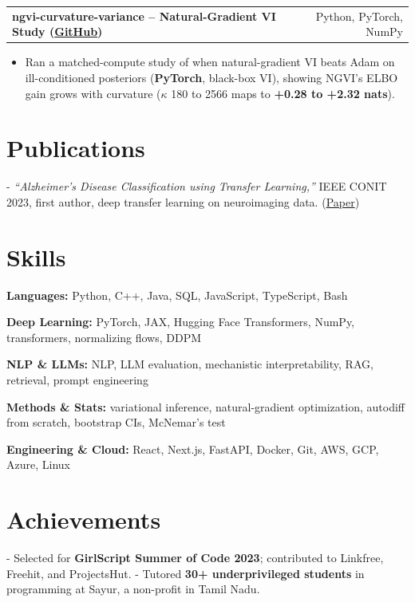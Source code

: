 \documentclass[letterpaper,11pt]{article}
\makeatletter
\newcommand{\projItem}[2]{%
  \vspace{6pt}
  \begin{tabular*}{\textwidth}{@{}l@{\extracolsep{\fill}}r@{}}
    \textbf{#1} & #2 \\
  \end{tabular*}\par\vspace{-2pt}
}
\newcommand{\skillLine}[2]{\textbf{#1:} #2\par\vspace{2pt}}
\newcommand{\inlineBlock}[1]{{\setlength{\leftskip}{0.18in}\small #1\par}}
\makeatother
\begin{document}
\projItem{ngvi-curvature-variance -- Natural-Gradient VI Study {\normalfont\small(\href{https://github.com/Deva-1903/ngvi-curvature-variance}{GitHub})}}{Python, PyTorch, NumPy}
\begin{itemize}
  \item Ran a matched-compute study of when natural-gradient VI beats Adam on ill-conditioned posteriors (\textbf{PyTorch}, black-box VI), showing NGVI's ELBO gain grows with curvature ($\kappa$ 180 to 2566 maps to \textbf{+0.28 to +2.32 nats}).
\end{itemize}

\section{Publications}
\inlineBlock{- \textit{``Alzheimer's Disease Classification using Transfer Learning,''} IEEE CONIT 2023, first author, deep transfer learning on neuroimaging data. {\normalfont\small(\href{https://ieeexplore.ieee.org/document/10205760}{Paper})}}

\section{Skills}
\skillLine{Languages}{Python, C++, Java, SQL, JavaScript, TypeScript, Bash}
\skillLine{Deep Learning}{PyTorch, JAX, Hugging Face Transformers, NumPy, transformers, normalizing flows, DDPM}
\skillLine{NLP \& LLMs}{NLP, LLM evaluation, mechanistic interpretability, RAG, retrieval, prompt engineering}
\skillLine{Methods \& Stats}{variational inference, natural-gradient optimization, autodiff from scratch, bootstrap CIs, McNemar's test}
\skillLine{Engineering \& Cloud}{React, Next.js, FastAPI, Docker, Git, AWS, GCP, Azure, Linux}

\section{Achievements}
\inlineBlock{- Selected for \textbf{GirlScript Summer of Code 2023}; contributed to Linkfree, Freehit, and ProjectsHut. - Tutored \textbf{30+ underprivileged students} in programming at Sayur, a non-profit in Tamil Nadu.}
\end{document}
